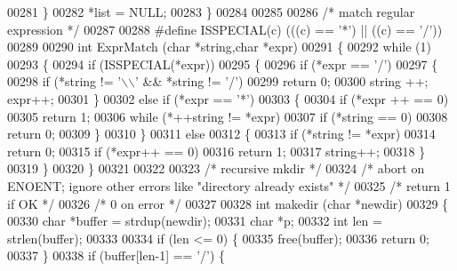 \begin{DoxyCode}
{{{00281     \}
00282   *list = NULL;
00283 \}
00284 
00285 
00286 \textcolor{comment}{/* match regular expression */}
00287 
00288 \textcolor{preprocessor}{#define ISSPECIAL(c) (((c) == '*') || ((c) == '/'))}
00289 
00290 \textcolor{keywordtype}{int} ExprMatch (\textcolor{keywordtype}{char} *\textcolor{keywordtype}{string},\textcolor{keywordtype}{char} *expr)
00291 \{
00292   \textcolor{keywordflow}{while} (1)
00293     \{
00294       \textcolor{keywordflow}{if} (ISSPECIAL(*expr))
00295         \{
00296           \textcolor{keywordflow}{if} (*expr == \textcolor{charliteral}{'/'})
00297             \{
00298               \textcolor{keywordflow}{if} (*\textcolor{keywordtype}{string} != \textcolor{charliteral}{'\(\backslash\)\(\backslash\)'} && *\textcolor{keywordtype}{string} != \textcolor{charliteral}{'/'})
00299                 \textcolor{keywordflow}{return} 0;
00300               \textcolor{keywordtype}{string} ++; expr++;
00301             \}
00302           \textcolor{keywordflow}{else} \textcolor{keywordflow}{if} (*expr == \textcolor{charliteral}{'*'})
00303             \{
00304               \textcolor{keywordflow}{if} (*expr ++ == 0)
00305                 \textcolor{keywordflow}{return} 1;
00306               \textcolor{keywordflow}{while} (*++\textcolor{keywordtype}{string} != *expr)
00307                 \textcolor{keywordflow}{if} (*\textcolor{keywordtype}{string} == 0)
00308                   \textcolor{keywordflow}{return} 0;
00309             \}
00310         \}
00311       \textcolor{keywordflow}{else}
00312         \{
00313           \textcolor{keywordflow}{if} (*\textcolor{keywordtype}{string} != *expr)
00314             \textcolor{keywordflow}{return} 0;
00315           \textcolor{keywordflow}{if} (*expr++ == 0)
00316             \textcolor{keywordflow}{return} 1;
00317           \textcolor{keywordtype}{string}++;
00318         \}
00319     \}
00320 \}
00321 
00322 
00323 \textcolor{comment}{/* recursive mkdir */}
00324 \textcolor{comment}{/* abort on ENOENT; ignore other errors like "directory already exists" */}
00325 \textcolor{comment}{/* return 1 if OK */}
00326 \textcolor{comment}{/*        0 on error */}
00327 
00328 \textcolor{keywordtype}{int} makedir (\textcolor{keywordtype}{char} *newdir)
00329 \{
00330   \textcolor{keywordtype}{char} *buffer = strdup(newdir);
00331   \textcolor{keywordtype}{char} *p;
00332   \textcolor{keywordtype}{int}  len = strlen(buffer);
00333 
00334   \textcolor{keywordflow}{if} (len <= 0) \{
00335     free(buffer);
00336     \textcolor{keywordflow}{return} 0;
00337   \}
00338   \textcolor{keywordflow}{if} (buffer[len-1] == \textcolor{charliteral}{'/'}) \{
}}}
\end{DoxyCode}
